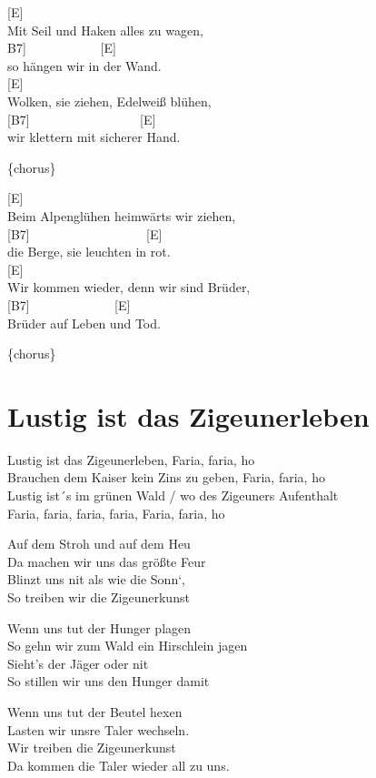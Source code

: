 \documentclass[
  letterpaper,
]{scrbook}
\begin{document}
{[}E{]} ~ ~ ~\\
Mit Seil und Haken alles zu wagen,\\
\hspace*{0.333em}{[}B7{]} ~ ~ ~ ~ ~ ~ ~{[}E{]}\\
so hängen wir in der Wand.\\
{[}E{]} ~ ~\\
Wolken, sie ziehen, Edelweiß blühen,\\
{[}B7{]} ~ ~ ~ ~ ~ ~ ~ ~ ~ ~ {[}E{]}\\
wir klettern mit sicherer Hand.

\{chorus\}

{[}E{]}\\
Beim Alpenglühen heimwärts wir ziehen,\\
{[}B7{]} ~ ~ ~ ~ ~ ~ ~ ~ ~ ~ ~{[}E{]}\\
die Berge, sie leuchten in rot.\\
{[}E{]} ~ ~ ~ ~ ~ ~ ~ ~ ~\\
Wir kommen wieder, denn wir sind Brüder,\\
{[}B7{]} ~ ~ ~ ~ ~ ~ ~ ~{[}E{]}\\
Brüder auf Leben und Tod.

\{chorus\}

\hypertarget{lustig-ist-das-zigeunerleben}{%
\chapter{Lustig ist das
Zigeunerleben}\label{lustig-ist-das-zigeunerleben}}

Lustig ist das Zigeunerleben, Faria, faria, ho\\
Brauchen dem Kaiser kein Zins zu geben, Faria, faria, ho\\
Lustig ist´s im grünen Wald / wo des Zigeuners Aufenthalt\\
Faria, faria, faria, faria, Faria, faria, ho

Auf dem Stroh und auf dem Heu\\
Da machen wir uns das größte Feur\\
Blinzt uns nit als wie die Sonn`,\\
So treiben wir die Zigeunerkunst

Wenn uns tut der Hunger plagen\\
So gehn wir zum Wald ein Hirschlein jagen\\
Sieht's der Jäger oder nit\\
So stillen wir uns den Hunger damit

Wenn uns tut der Beutel hexen\\
Lasten wir unsre Taler wechseln.\\
Wir treiben die Zigeunerkunst\\
Da kommen die Taler wieder all zu uns.
\end{document}
